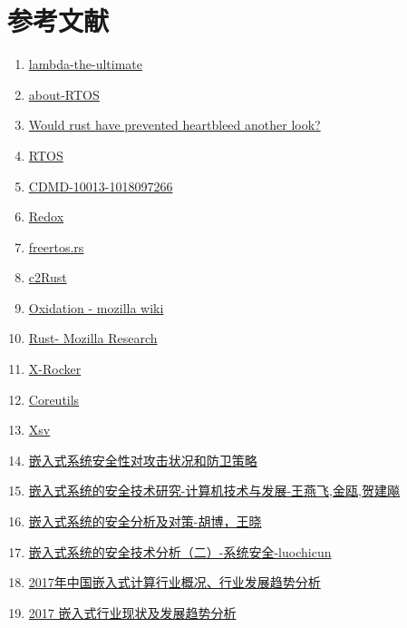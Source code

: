 \documentclass[12pt, a4paper]{article}
\begin{document}
\section{参考文献}
\begin{enumerate}
	\item \href{http://lambda-the-ultimate.org/node/4009}{lambda-the-ultimate}
	\item \href{https://www.freertos.org/about-RTOS.html}{about-RTOS}
	\item \href{https://tonyarcieri.com/would-rust-have-prevented-heartbleed-another-look}{Would rust have prevented heartbleed another look?}
	\item \href{http://www.360doc.com/content/16/0315/09/478627_542305628.shtml}{RTOS}
	\item \href{http://cdmd.cnki.com.cn/Article/CDMD-10013-1018097266.htm}{CDMD-10013-1018097266}
	\item \href{https://www.redox-os.org}{Redox}
	\item \href{https://github.com/hashmismatch/freertos.rs}{freertos.rs}
	\item \href{https://c2rust.com}{c2Rust}
	\item \href{https://wiki.mozilla.org/Oxidation}{Oxidation - mozilla wiki}
	\item \href{https://research.mozilla.org/rust/}{Rust- Mozilla Research}
	\item \href{https://github.com/OSH-2018/X-rocker}{X-Rocker}
	\item \href{https://github.com/uutils/coreutils}{Coreutils}
	\item \href{https://github.com/BurntSushi/xsv}{Xsv}
	\item \href{http://www.chinaaet.com/article/105340}{嵌入式系统安全性对攻击状况和防卫策略}
	\item \href{http://request.uml.com.cn/upfile/%E5%B5%8C%E5%85%A5%E5%BC%8F%E7%B3%BB%E7%BB%9F%E7%9A%84%E5%AE%89%E5%85%A8%E6%8A%80%E6%9C%AF%E7%A0%94%E7%A9%B6.pdf}{嵌入式系统的安全技术研究-计算机技术与发展-王燕飞,金瓯,贺建飚}
	\item \href{https://wenku.baidu.com/view/4bbb3c1114791711cc7917b5.html}{嵌入式系统的安全分析及对策-胡博，王晓}
	\item \href{https://www.4hou.com/system/12274.html}{嵌入式系统的安全技术分析（二）-系统安全-luochicun}
	\item \href{http://www.ccomsoft.com/show.asp?typeid=2&sortid=35&id=465}{2017年中国嵌入式计算行业概况、行业发展趋势分析}
	\item \href{https://www.jianshu.com/p/f965e83f78f9}{2017 嵌入式行业现状及发展趋势分析} 

\end{enumerate}
\end{document}
